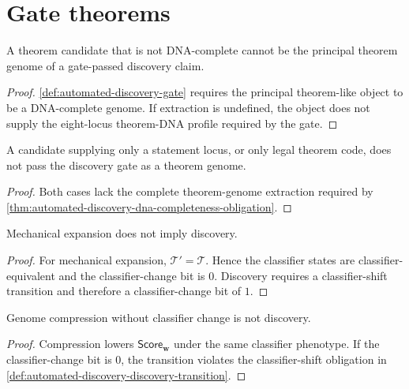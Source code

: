 \section{Gate theorems}
\label{sec:automated-discovery-gate-theorems}

\begin{theorem}
\label{thm:automated-discovery-dna-completeness-obligation}
A theorem candidate that is not DNA-complete cannot be the principal theorem
genome of a gate-passed discovery claim.
\end{theorem}
\begin{proof}
\autoref{def:automated-discovery-gate} requires the principal theorem-like
object to be a DNA-complete genome. If extraction is undefined, the object
does not supply the eight-locus theorem-DNA profile required by the gate.
\end{proof}

\begin{corollary}
\label{cor:automated-discovery-statement-code-insufficient}
A candidate supplying only a statement locus, or only legal theorem code, does
not pass the discovery gate as a theorem genome.
\end{corollary}
\begin{proof}
Both cases lack the complete theorem-genome extraction required by
\autoref{thm:automated-discovery-dna-completeness-obligation}.
\end{proof}

\begin{theorem}
\label{thm:automated-discovery-mechanical-not-discovery}
Mechanical expansion does not imply discovery.
\end{theorem}
\begin{proof}
For mechanical expansion, $\mathcal T'=\mathcal T$. Hence the classifier
states are classifier-equivalent and the classifier-change bit is $0$.
Discovery requires a classifier-shift transition and therefore a
classifier-change bit of $1$.
\end{proof}

\begin{theorem}
\label{thm:automated-discovery-compression-not-discovery}
Genome compression without classifier change is not discovery.
\end{theorem}
\begin{proof}
Compression lowers $\mathsf{Score}_{\mathbf w}$ under the same classifier
phenotype. If the classifier-change bit is $0$, the transition violates the
classifier-shift obligation in
\autoref{def:automated-discovery-discovery-transition}.
\end{proof}

